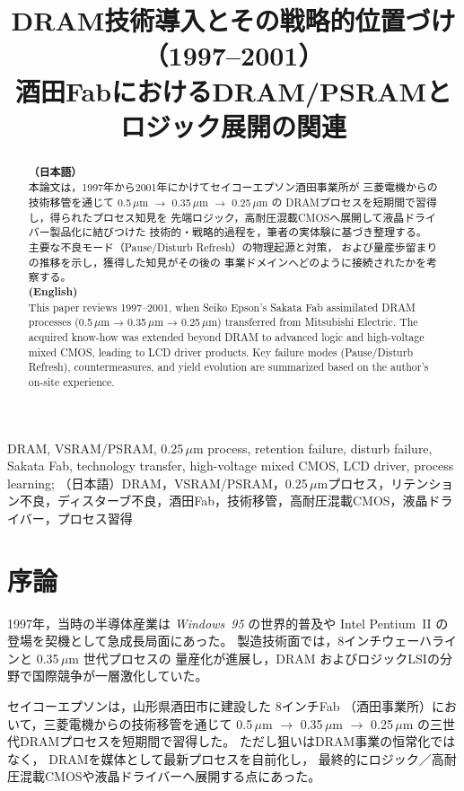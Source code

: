 \documentclass[conference]{IEEEtran}
\title{DRAM技術導入とその戦略的位置づけ（1997--2001）\\
\large 酒田FabにおけるDRAM/PSRAMとロジック展開の関連}
\author{%
  \IEEEauthorblockN{三溝 真一 (Shinichi Samizo)}%
  \IEEEauthorblockA{独立系半導体研究者（元セイコーエプソン）\\%
  Independent Semiconductor Researcher (ex-Seiko Epson)\\%
  Email: \href{mailto:shin3t72@gmail.com}{shin3t72@gmail.com}\\%
  GitHub: \url{https://github.com/Samizo-AITL}}%
}
\begin{document}
\maketitle

\begin{abstract}
\textbf{（日本語）}\\
本論文は，1997年から2001年にかけてセイコーエプソン酒田事業所が
三菱電機からの技術移管を通じて \mbox{0.5\,$\mu$m} $\rightarrow$ \mbox{0.35\,$\mu$m} $\rightarrow$ \mbox{0.25\,$\mu$m} の
DRAMプロセスを短期間で習得し，得られたプロセス知見を
先端ロジック，高耐圧混載CMOSへ展開して液晶ドライバー製品化に結びつけた
技術的・戦略的過程を，筆者の実体験に基づき整理する。
主要な不良モード（Pause/Disturb Refresh）の物理起源と対策，
および量産歩留まりの推移を示し，獲得した知見がその後の
事業ドメインへどのように接続されたかを考察する。\\[1ex]

\textbf{(English)}\\
This paper reviews 1997–2001, when Seiko Epson’s Sakata Fab
assimilated DRAM processes (0.5\,$\mu$m → 0.35\,$\mu$m → 0.25\,$\mu$m) transferred from Mitsubishi Electric.
The acquired know-how was extended beyond DRAM to advanced logic
and high-voltage mixed CMOS, leading to LCD driver products.
Key failure modes (Pause/Disturb Refresh), countermeasures, and yield evolution
are summarized based on the author’s on-site experience.
\end{abstract}

\begin{IEEEkeywords}
DRAM, VSRAM/PSRAM, 0.25\,$\mu$m process, retention failure, disturb failure, Sakata Fab, technology transfer, high-voltage mixed CMOS, LCD driver, process learning;
（日本語）DRAM，VSRAM/PSRAM，0.25\,$\mu$mプロセス，リテンション不良，ディスターブ不良，酒田Fab，技術移管，高耐圧混載CMOS，液晶ドライバー，プロセス習得
\end{IEEEkeywords}

\section{序論}
1997年，当時の半導体産業は \textit{Windows~95} の世界的普及や
Intel Pentium~II の登場を契機として急成長局面にあった。
製造技術面では，8インチウェーハラインと 0.35\,$\mu$m 世代プロセスの
量産化が進展し，DRAM およびロジックLSIの分野で国際競争が一層激化していた。

セイコーエプソンは，山形県酒田市に建設した 8インチFab
（酒田事業所）において，三菱電機からの技術移管を通じて
0.5\,$\mu$m $\rightarrow$ 0.35\,$\mu$m $\rightarrow$ 0.25\,$\mu$m
の三世代DRAMプロセスを短期間で習得した。
ただし狙いはDRAM事業の恒常化ではなく，
DRAMを媒体として最新プロセスを自前化し，
最終的にロジック／高耐圧混載CMOSや液晶ドライバーへ展開する点にあった。
\end{document}
